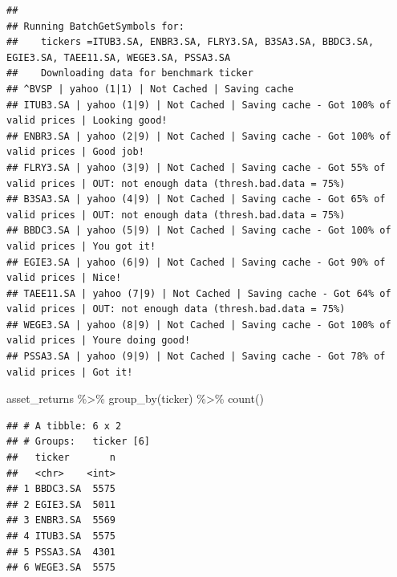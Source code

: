 \documentclass[
]{article}
\newenvironment{Shaded}{\begin{snugshade}}{\end{snugshade}}
\newcommand{\FunctionTok}[1]{\textcolor[rgb]{0.00,0.00,0.00}{#1}}
\newcommand{\NormalTok}[1]{#1}
\newcommand{\SpecialCharTok}[1]{\textcolor[rgb]{0.00,0.00,0.00}{#1}}
\begin{document}
\begin{verbatim}
## 
## Running BatchGetSymbols for:
##    tickers =ITUB3.SA, ENBR3.SA, FLRY3.SA, B3SA3.SA, BBDC3.SA, EGIE3.SA, TAEE11.SA, WEGE3.SA, PSSA3.SA
##    Downloading data for benchmark ticker
## ^BVSP | yahoo (1|1) | Not Cached | Saving cache
## ITUB3.SA | yahoo (1|9) | Not Cached | Saving cache - Got 100% of valid prices | Looking good!
## ENBR3.SA | yahoo (2|9) | Not Cached | Saving cache - Got 100% of valid prices | Good job!
## FLRY3.SA | yahoo (3|9) | Not Cached | Saving cache - Got 55% of valid prices | OUT: not enough data (thresh.bad.data = 75%)
## B3SA3.SA | yahoo (4|9) | Not Cached | Saving cache - Got 65% of valid prices | OUT: not enough data (thresh.bad.data = 75%)
## BBDC3.SA | yahoo (5|9) | Not Cached | Saving cache - Got 100% of valid prices | You got it!
## EGIE3.SA | yahoo (6|9) | Not Cached | Saving cache - Got 90% of valid prices | Nice!
## TAEE11.SA | yahoo (7|9) | Not Cached | Saving cache - Got 64% of valid prices | OUT: not enough data (thresh.bad.data = 75%)
## WEGE3.SA | yahoo (8|9) | Not Cached | Saving cache - Got 100% of valid prices | Youre doing good!
## PSSA3.SA | yahoo (9|9) | Not Cached | Saving cache - Got 78% of valid prices | Got it!
\end{verbatim}

\begin{Shaded}
\begin{Highlighting}[]
\NormalTok{asset\_returns }\SpecialCharTok{\%\textgreater{}\%} 
  \FunctionTok{group\_by}\NormalTok{(ticker) }\SpecialCharTok{\%\textgreater{}\%} 
  \FunctionTok{count}\NormalTok{()}
\end{Highlighting}
\end{Shaded}

\begin{verbatim}
## # A tibble: 6 x 2
## # Groups:   ticker [6]
##   ticker       n
##   <chr>    <int>
## 1 BBDC3.SA  5575
## 2 EGIE3.SA  5011
## 3 ENBR3.SA  5569
## 4 ITUB3.SA  5575
## 5 PSSA3.SA  4301
## 6 WEGE3.SA  5575
\end{verbatim}
\end{document}
